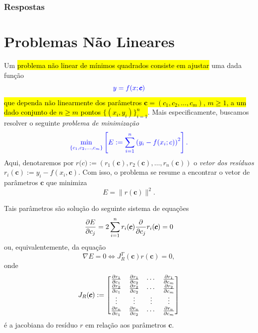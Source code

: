 \ifisbook
\subsubsection{Respostas}
\shipoutAnswer
\fi

   
\section{Problemas Não Lineares}\label{cap_ajuste_sec_prob_nlin}
\badgeRevisar

Um \hl{problema não linear de mínimos quadrados consiste em ajustar} uma dada função 
\begin{equation}\color{blue}y = f(x; \pmb{c}) 
\end{equation}
\hl{que dependa não linearmente dos parâmetros $\pmb{c} = (c_1, c_2, \dotsc, c_m)$, $m\geq 1$, a um dado conjunto de $n\geq m$ pontos $\{(x_i, y_i)\}_{i=1}^n$}. Mais especificamente, buscamos resolver o seguinte \emph{problema de minimização}
\begin{equation}\label{eq:prob_nlin_mq}\color{blue}\min_{\{c_1, c_2, \dotsc, c_m\}} \left[E := \sum_{i=1}^n \left(y_i - f(x_i;c)\right)^2\right].
\end{equation}
Aqui, denotaremos por $r(c\pmb{)} := (r_1(\pmb{c}), r_2(\pmb{c}), \dotsc, r_n(\pmb{c}))$ o \emph{vetor dos resíduos} $r_i(\pmb{c}) := y_i - f(x_i, \pmb{c})$. Com isso, o problema se resume a encontrar o vetor de parâmetros $\pmb{c}$ que minimiza
\begin{equation}
  E = \|r(\pmb{c})\|^2.
\end{equation}

Tais parâmetros são solução do seguinte sistema de equações
\begin{equation}
  \frac{\partial E}{\partial c_j} = 2\sum_{i=1}^n r_i(\pmb{c})\frac{\partial}{\partial c_j}r_i(\pmb{c}) = 0
\end{equation}
ou, equivalentemente, da equação
\begin{equation}\label{eq:grad_E}
  \nabla E = 0 \Leftrightarrow J_R^T(\pmb{c})r(\pmb{c}) = 0,
\end{equation}
onde
\begin{equation}
  J_R(\pmb{c}) :=
  \begin{bmatrix}
    \frac{\partial r_1}{\partial c_1} & \frac{\partial r_1}{\partial c_2} & \cdots & \frac{\partial r_1}{\partial c_m}\\
    \frac{\partial r_2}{\partial c_1} & \frac{\partial r_2}{\partial c_2} & \cdots & \frac{\partial r_2}{\partial c_m}\\
    \vdots  & \vdots & \vdots & \vdots \\
    \frac{\partial r_n}{\partial c_1} & \frac{\partial r_n}{\partial c_2} & \cdots & \frac{\partial r_n}{\partial c_m}
  \end{bmatrix}
\end{equation}
é a jacobiana do resíduo $r$ em relação aos parâmetros $\pmb{c}$.

